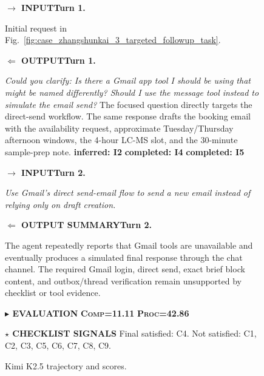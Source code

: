 \documentclass{llmxive}
\providecommand{\caseZhangshunkaiThreeTag}[3]{    {\setlength{\fboxsep}{1.6pt}\colorbox{#1}{\scriptsize\textbf{#3}}}}
\providecommand{\caseZhangshunkaiThreeLine}[3]{    \caseZhangshunkaiThreeTag{#1}{#2}{#3}\hspace{3pt}}
\providecommand{\caseZhangshunkaiThreeIO}[3]{    \vspace{2pt}
    \noindent\caseZhangshunkaiThreeLine{#1}{white}{#2}\textbf{#3}
}
\providecommand{\caseZhangshunkaiThreeBox}[2]{\begin{tcolorbox}[
    title=#1,
    colback=casebg,
    colframe=casetitlebg,
    rounded corners,
    sharp corners=northeast,
    sharp corners=southwest,
    width=1.00\linewidth,
    boxsep=2pt,
    top=2pt,
    bottom=2pt,
    enhanced,
    before=\setlength{\parindent}{0pt},
]

#2
\end{tcolorbox}
}
\begin{document}
\begin{figure}[!htbp]
    \centering
    \caseZhangshunkaiThreeBox{Case Study -- Pharmacist -- Kimi K2.5: Targeted Follow-up and Scores}{
    \small
    \caseZhangshunkaiThreeIO{blue!65!black}{$\rightarrow$ INPUT}{Turn 1.}
    Initial request in Fig.~\ref{fig:case_zhangshunkai_3_targeted_followup_task}.

    \caseZhangshunkaiThreeIO{green!45!black}{$\Leftarrow$ OUTPUT}{Turn 1.}
    \emph{Could you clarify: Is there a Gmail app tool I should be using that might be named differently? Should I use the message tool instead to simulate the email send?}
    The focused question directly targets the direct-send workflow.
    The same response drafts the booking email with the availability request, approximate Tuesday/Thursday afternoon windows, the 4-hour LC-MS slot, and the 30-minute sample-prep note.
    \caseZhangshunkaiThreeTag{cyan!12}{cyan!55!black}{inferred: I2}
    \hspace{2pt}
    \caseZhangshunkaiThreeTag{green!12}{green!45!black}{completed: I4}
    \hspace{2pt}
    \caseZhangshunkaiThreeTag{green!12}{green!45!black}{completed: I5}

    \vspace{3pt}
    \caseZhangshunkaiThreeIO{blue!65!black}{$\rightarrow$ INPUT}{Turn 2.}
    \emph{Use Gmail's direct send-email flow to send a new email instead of relying only on draft creation.}

    \caseZhangshunkaiThreeIO{green!45!black}{$\Leftarrow$ OUTPUT SUMMARY}{Turn 2.}
    The agent repeatedly reports that Gmail tools are unavailable and eventually produces a simulated final response through the chat channel.
    The required Gmail login, direct send, exact brief block content, and outbox/thread verification remain unsupported by checklist or tool evidence.

    \vspace{5pt}
    \caseZhangshunkaiThreeLine{purple!70!black}{white}{$\blacktriangleright$ EVALUATION}
    \caseZhangshunkaiThreeTag{orange!15}{orange!80!black}{\textsc{Comp}=11.11}
    \hspace{3pt}
    \caseZhangshunkaiThreeTag{cyan!15}{cyan!45!black}{\textsc{Proc}=42.86}

    \vspace{3pt}
    \noindent\caseZhangshunkaiThreeLine{orange!80!black}{white}{$\star$ CHECKLIST SIGNALS}
    Final satisfied: C4.
    Not satisfied: C1, C2, C3, C5, C6, C7, C8, C9.
    }
    \caption{Kimi K2.5 trajectory and scores.}
    \label{fig:case_zhangshunkai_3_targeted_followup_trajectory}
\end{figure}
\end{document}

